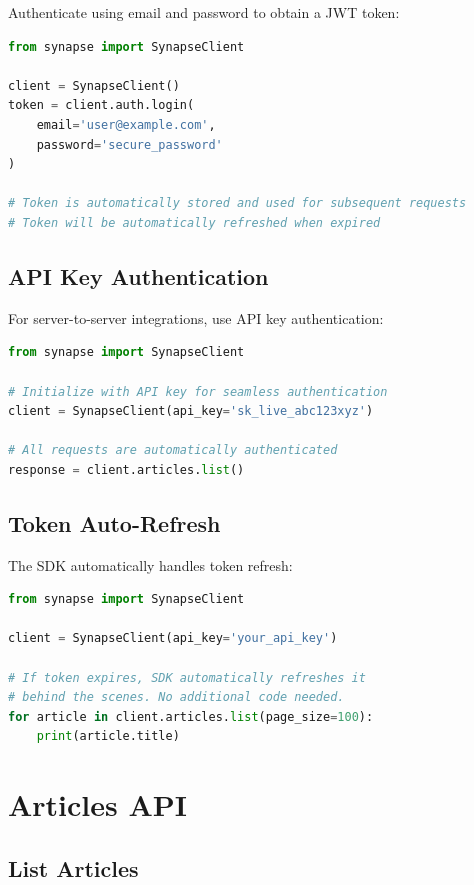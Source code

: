 \documentclass{report}
\begin{document}
Authenticate using email and password to obtain a JWT token:

\begin{lstlisting}[language=Python]
from synapse import SynapseClient

client = SynapseClient()
token = client.auth.login(
    email='user@example.com',
    password='secure_password'
)

# Token is automatically stored and used for subsequent requests
# Token will be automatically refreshed when expired
\end{lstlisting}

\subsection{API Key Authentication}

For server-to-server integrations, use API key authentication:

\begin{lstlisting}[language=Python]
from synapse import SynapseClient

# Initialize with API key for seamless authentication
client = SynapseClient(api_key='sk_live_abc123xyz')

# All requests are automatically authenticated
response = client.articles.list()
\end{lstlisting}

\subsection{Token Auto-Refresh}

The SDK automatically handles token refresh:

\begin{lstlisting}[language=Python]
from synapse import SynapseClient

client = SynapseClient(api_key='your_api_key')

# If token expires, SDK automatically refreshes it
# behind the scenes. No additional code needed.
for article in client.articles.list(page_size=100):
    print(article.title)
\end{lstlisting}

\section{Articles API}

\subsection{List Articles}
\end{document}
